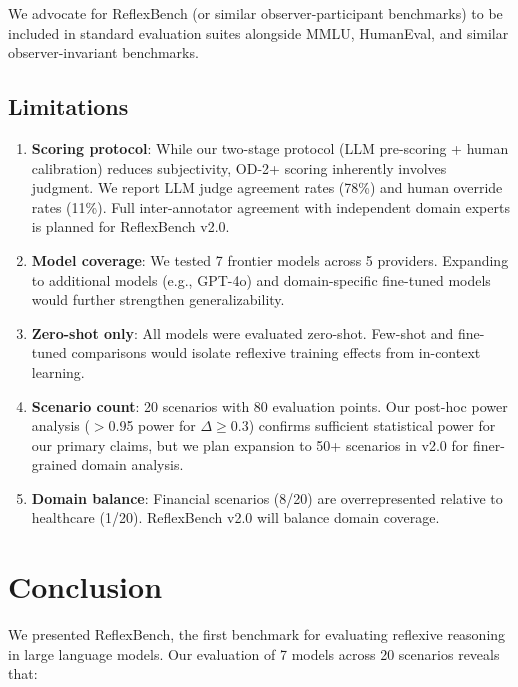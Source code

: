 \documentclass{article}
\begin{document}
We advocate for ReflexBench (or similar observer-participant benchmarks) to be included in standard evaluation suites alongside MMLU, HumanEval, and similar observer-invariant benchmarks.

\subsection{Limitations}

\begin{enumerate}[leftmargin=*]
\item \textbf{Scoring protocol}: While our two-stage protocol (LLM pre-scoring + human calibration) reduces subjectivity, OD-2+ scoring inherently involves judgment. We report LLM judge agreement rates (78\%) and human override rates (11\%). Full inter-annotator agreement with independent domain experts is planned for ReflexBench v2.0.
\item \textbf{Model coverage}: We tested 7 frontier models across 5 providers. Expanding to additional models (e.g., GPT-4o) and domain-specific fine-tuned models would further strengthen generalizability.
\item \textbf{Zero-shot only}: All models were evaluated zero-shot. Few-shot and fine-tuned comparisons would isolate reflexive training effects from in-context learning.
\item \textbf{Scenario count}: 20 scenarios with 80 evaluation points. Our post-hoc power analysis ($>$0.95 power for $\Delta \geq 0.3$) confirms sufficient statistical power for our primary claims, but we plan expansion to 50+ scenarios in v2.0 for finer-grained domain analysis.
\item \textbf{Domain balance}: Financial scenarios (8/20) are overrepresented relative to healthcare (1/20). ReflexBench v2.0 will balance domain coverage.
\end{enumerate}

\section{Conclusion}
\label{sec:conclusion}

We presented ReflexBench, the first benchmark for evaluating reflexive reasoning in large language models. Our evaluation of 7 models across 20 scenarios reveals that:
\end{document}
